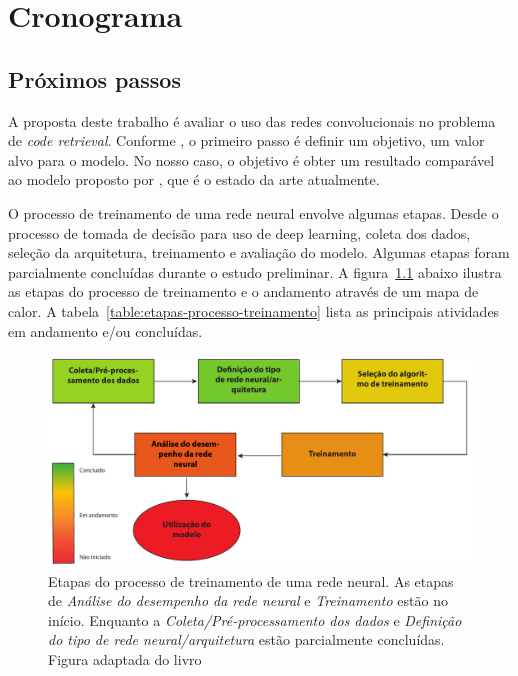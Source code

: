 \chapter{Cronograma}
\label{cap:cronograma}

\section{Próximos passos}

A proposta deste trabalho é avaliar o uso das redes convolucionais no problema de \textit{code retrieval}. Conforme \cite{Goodfellow-et-al-2016:pratical-methodology}, o primeiro passo é definir um objetivo, um valor alvo para o modelo. No nosso caso, o objetivo é obter um resultado comparável ao modelo proposto por \cite{cambronero-deep-learning-code-search:2019}, que é o estado da arte atualmente.

O processo de treinamento de uma rede neural envolve algumas etapas. Desde o processo de tomada de decisão para uso de deep learning, coleta dos dados, seleção da arquitetura, treinamento e avaliação do modelo. Algumas etapas foram parcialmente concluídas durante o estudo preliminar. A figura~\ref{fig:neural-network-process-training} abaixo ilustra as etapas do processo de treinamento e o andamento através de um mapa de calor. A tabela~\ref{table:etapas-processo-treinamento} lista as principais atividades em andamento e/ou concluídas.


\begin{figure}[h]
    \centering
    \includegraphics[width=1\textwidth]{figuras/cap-cronograma/training_process.pdf}
    \caption{Etapas do processo de treinamento de uma rede neural. As etapas de \emph{Análise do desempenho da rede neural} e \emph{Treinamento} estão no início. Enquanto a \emph{Coleta/Pré-processamento dos dados} e \emph{Definição do tipo de rede neural/arquitetura} estão parcialmente concluídas. Figura adaptada do livro \cite{nndesign:2014:pratical-training-issues}}
    \label{fig:neural-network-process-training}
\end{figure}

